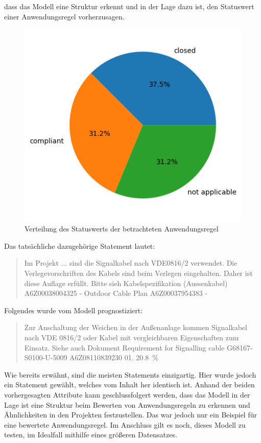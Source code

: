 dass das Modell eine Struktur erkennt und in der Lage dazu ist, den Statuswert einer Anwendungsregel vorherzusagen.
\begin{figure}[H]
    \centering
    \includegraphics[width=.5\textwidth]{abbildungen/StatusTest.png}
    \caption{Verteilung des Statuswerts der betrachteten Anwendungsregel}
    \label{fig:StatusTest}
\end{figure}
\pagebreak
Das tatsächliche dazugehörige Statement lautet: 
\begin{quotation}
    \noindent Im Projekt ... sind die Signalkabel nach VDE0816/2 verwendet. Die Verlegevorschriften des Kabels sind beim Verlegen eingehalten. Daher ist diese Auflage erfüllt.  
    Bitte sieh  Kabelspezifikation (Aussenkabel)  A6Z00038004325  -  Outdoor Cable Plan  A6Z00037954383  -
\end{quotation}
Folgendes wurde vom Modell prognostiziert:
\begin{quotation}
    \noindent Zur Anschaltung der Weichen in der Außenanlage kommen Signalkabel nach  VDE 0816/2 oder Kabel mit vergleichbaren Eigenschaften zum Einsatz. Siehe  auch Dokument Requirement for 
    Signalling cable G68167-S0100-U-5009   A6Z08110839230  01.  20.8~\%
\end{quotation}
Wie bereits erwähnt, sind die meisten Statements einzigartig. Hier wurde jedoch ein Statement gewählt, welches vom Inhalt her identisch ist. Anhand der beiden vorhergesagten Attribute
kann geschlussfolgert werden, dass das Modell in der Lage ist eine Struktur beim Bewerten von Anwendungsregeln zu erkennen und Ähnlichkeiten in den Projekten festzustellen. Das war jedoch
nur ein Beispiel für eine bewertete Anwendungsregel. Im Anschluss gilt es noch, dieses Modell zu testen, im Idealfall mithilfe eines größeren Datensatzes.